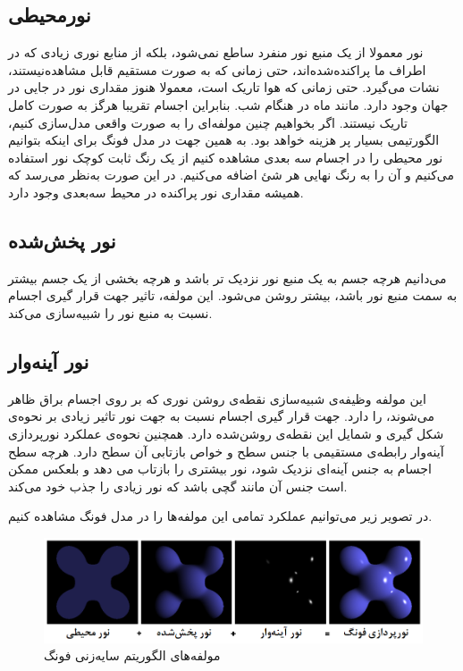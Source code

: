 \subsection{نورمحیطی}

نور معمولا از یک منبع نور منفرد ساطع نمی‌شود، بلکه
از منابع نوری زیادی که در اطراف ما پراکنده‌شده‌اند،
حتی زمانی که به صورت مستقیم قابل مشاهده‌نیستند،
نشات می‌گیرد.
حتی زمانی که هوا تاریک است، معمولا هنوز مقداری 
نور در جایی در جهان وجود دارد.
مانند ماه در هنگام شب.
بنابراین اجسام تقریبا هرگز به صورت کامل 
تاریک نیستند.
اگر بخواهیم چنین مولفه‌ای را به صورت واقعی مدل‌سازی کنیم، 
الگورتیمی بسیار پر هزینه خواهد بود.
به همین جهت در مدل فونگ برای اینکه بتوانیم نور محیطی را 
در اجسام سه بعدی مشاهده کنیم 
از یک رنگ ثابت کوچک نور استفاده می‌کنیم و آن را به 
رنگ نهایی هر شئ اضافه می‌کنیم.
در این صورت به‌نظر می‌رسد که همیشه مقداری نور پراکنده در محیط 
سه‌بعدی وجود دارد.
\cite{LearnOpenGLPhongShading}
\subsection{نور پخش‌شده}

می‌دانیم هرچه جسم به یک منبع نور نزدیک تر باشد و هرچه 
بخشی از یک جسم بیشتر به سمت منبع نور باشد، بیشتر روشن می‌شود.
این مولفه، تاثیر جهت قرار گیری 
اجسام نسبت به منبع نور را شبیه‌سازی می‌کند.
\cite{LearnOpenGLPhongShading}
\subsection{نور آینه‌وار}

این مولفه وظیفه‌ی شبیه‌سازی نقطه‌ی روشن نوری که 
بر روی اجسام براق ظاهر می‌شوند، را دارد.
جهت قرار گیری اجسام نسبت به جهت نور 
تاثیر زیادی بر نحوه‌ی شکل گیری و شمایل این 
نقطه‌ی روشن‌شده دارد.
همچنین نحوه‌ی عملکرد نورپردازی آینه‌وار رابطه‌ی مستقیمی با 
 جنس سطح و خواص بازتابی آن سطح دارد.
هرچه سطح اجسام به جنس آینه‌ای نزدیک شود، نور بیشتری را بازتاب می دهد 
و بلعکس ممکن است جنس آن مانند گچی باشد که نور زیادی را جذب خود می‌کند.
\cite{LearnOpenGLPhongShading}

در تصویر زیر می‌توانیم عملکرد تمامی این مولفه‌ها را در مدل فونگ مشاهده کنیم.

\begin{figure}[ht]
	\centerline{\includegraphics[width=\textwidth,height=\textheight,keepaspectratio]{Figures/Ch2/Phong_components.png}}

	\caption{مولفه‌های الگوریتم سایه‌زنی فونگ
    \cite{PhongShadingWikipedia}
    }
	\label{fig:PhongShadingWikipedia}
\end{figure}
